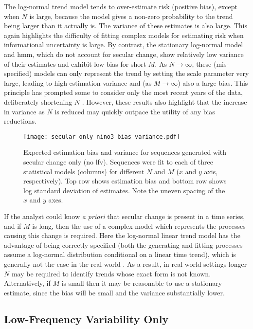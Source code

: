 \documentclass[
  draft,
  linenumbers
]{agujournal2018}
\makeatletter
\newcommand{\ie}{i.e.\@\xspace}
\makeatother
\begin{document}
The log-normal trend model tends to over-estimate risk (positive bias), except when $N$ is large, because the model gives a non-zero probability to the trend being larger than it actually is.
The variance of these estimates is also large.
This again highlights the difficulty of fitting complex models for estimating risk when informational uncertainty is large.
By contrast, the stationary log-normal model and \gls{hmm}, which do not account for secular change, show relatively low variance of their estimates and exhibit low bias for short $M$.
As $N \rightarrow \infty$, these (mis-specified) models can only represent the trend by setting the scale parameter very large, leading to high estimation variance and (as $M \rightarrow \infty$) also a large bias.
This principle has prompted some to consider only the most recent years of the data, deliberately shortening $N$ \citep[\ie,][]{Muller:2014fc}.
However, these results also highlight that the increase in variance as $N$ is reduced may quickly outpace the utility of any bias reductions.

\begin{figure}
  \centering
  \texttt{[image: secular-only-nino3-bias-variance.pdf]}
  \caption{
    Expected estimation bias and variance for sequences generated with secular change only (no \gls{lfv}).
    Sequences were fit to each of three statistical models (columns) for different $N$ and $M$ ($x$ and $y$ axis, respectively).
    Top row shows estimation bias and bottom row shows log standard deviation of estimates.
    Note the uneven spacing of the $x$ and $y$ axes.
  }\label{fig:secular-nino3-bias-variance}
\end{figure}

If the analyst could know \emph{a priori} that secular change is present in a time series, and if $M$ is long, then the use of a complex model which represents the processes causing this change is required.
Here the log-normal linear trend model has the advantage of being correctly specified (both the generating and fitting processes assume a log-normal distribution conditional on a linear time trend), which is generally not the case in the real world \citep{Montanari:2014hl,Serinaldi:2015bq}.
As a result, in real-world settings longer $N$ may be required to identify trends whose exact form is not known.
Alternatively, if $M$ is small then it may be reasonable to use a stationary estimate, since the bias will be small and the variance substantially lower.

\subsection{Low-Frequency Variability Only}
\end{document}
